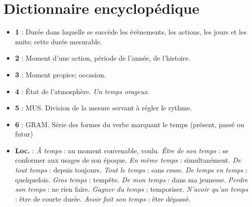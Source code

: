 
\section{Dictionnaire encyclopédique}

\begin{itemize}[leftmargin=1cm, label=, itemsep=1pt]
\item {\bf 1} : Durée dans laquelle se succède les évènements, les actions, les jours et les nuits; cette durée mesurable.
\item {\bf 2} : Moment d'une action, période de l'année, de l'histoire.
\item {\bf 3} : Moment propice; occasion.
\item {\bf 4} : État de l'atmosphère. {\it Un temps orageux}.
\item {\bf 5} : {\footnotesize \sf MUS.} Division de la mesure servant à régler le rythme.
\item {\bf 6} : {\footnotesize \sf GRAM.} Série des formes du verbe marquant le temps (présent, passé ou futur)
\item {\footnotesize \bf Loc.} : {\it À temps} : au moment convenable, voulu. {\it Être de son temps} : se conformer aux usages de son époque. {\it En même temps} : simultanément. {\it De tout temps} : depuis toujours. {\it Tout le temps} : sans cesse. {\it De temps en temps} : quelquefois. {\it Gros temps} : tempête. {\it De mon temps} : dans ma jeunesse. {\it Perdre son temps} : ne rien faire. {\it Gagner du temps} : temporiser. {\it N'avoir qu'un temps} : être de courte durée. {\it Avoir fait son temps} : être dépassé.
\end{itemize}

